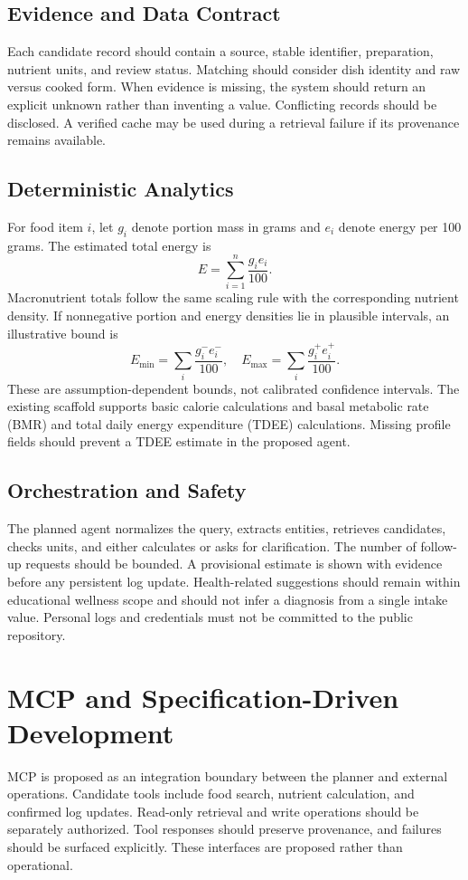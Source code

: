 \documentclass[conference]{IEEEtran}
\begin{document}
\subsection{Evidence and Data Contract}
Each candidate record should contain a source, stable identifier, preparation, nutrient units, and review status. Matching should consider dish identity and raw versus cooked form. When evidence is missing, the system should return an explicit unknown rather than inventing a value. Conflicting records should be disclosed. A verified cache may be used during a retrieval failure if its provenance remains available.
\subsection{Deterministic Analytics}
For food item $i$, let $g_i$ denote portion mass in grams and $e_i$ denote energy per 100 grams. The estimated total energy is
\begin{equation} E=\sum_{i=1}^{n}\frac{g_i e_i}{100}. \end{equation}
Macronutrient totals follow the same scaling rule with the corresponding nutrient density. If nonnegative portion and energy densities lie in plausible intervals, an illustrative bound is
\begin{equation} E_{\min}=\sum_i\frac{g_i^- e_i^-}{100},\quad E_{\max}=\sum_i\frac{g_i^+ e_i^+}{100}. \end{equation}
These are assumption-dependent bounds, not calibrated confidence intervals. The existing scaffold supports basic calorie calculations and basal metabolic rate (BMR) and total daily energy expenditure (TDEE) calculations. Missing profile fields should prevent a TDEE estimate in the proposed agent.
\subsection{Orchestration and Safety}
The planned agent normalizes the query, extracts entities, retrieves candidates, checks units, and either calculates or asks for clarification. The number of follow-up requests should be bounded. A provisional estimate is shown with evidence before any persistent log update. Health-related suggestions should remain within educational wellness scope and should not infer a diagnosis from a single intake value. Personal logs and credentials must not be committed to the public repository.
\section{MCP and Specification-Driven Development}
MCP is proposed as an integration boundary between the planner and external operations. Candidate tools include food search, nutrient calculation, and confirmed log updates. Read-only retrieval and write operations should be separately authorized. Tool responses should preserve provenance, and failures should be surfaced explicitly. These interfaces are proposed rather than operational.
\end{document}
